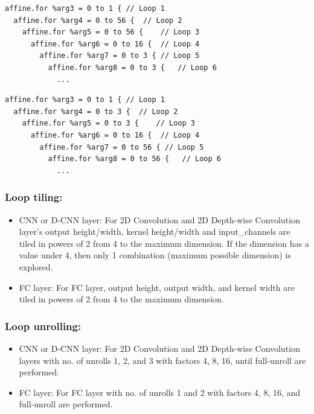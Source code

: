\begin{lstlisting}[caption={Example depth-wise conv2d at Affine dialect}, label={lst:dconv2dAffineOutputFirst}]
affine.for %arg3 = 0 to 1 { // Loop 1
  affine.for %arg4 = 0 to 56 {  // Loop 2
    affine.for %arg5 = 0 to 56 {    // Loop 3
      affine.for %arg6 = 0 to 16 {  // Loop 4
        affine.for %arg7 = 0 to 3 { // Loop 5
          affine.for %arg8 = 0 to 3 {   // Loop 6
            ...
\end{lstlisting}
\clearpage
\begin{lstlisting}[caption={Example depth-wise conv2d at Affine dialect}, label={lst:dconv2dAffineKernelFirst}]
affine.for %arg3 = 0 to 1 { // Loop 1
  affine.for %arg4 = 0 to 3 {  // Loop 2
    affine.for %arg5 = 0 to 3 {    // Loop 3
      affine.for %arg6 = 0 to 16 {  // Loop 4
        affine.for %arg7 = 0 to 56 { // Loop 5
          affine.for %arg8 = 0 to 56 {   // Loop 6
            ...
\end{lstlisting}

\subsubsection{Loop tiling:}
\begin{itemize}
    \item CNN or D-CNN layer: For 2D Convolution and 2D Depth-wise Convolution layer's output height/width, kernel height/width and input\_channels are tiled in powers of 2 from 4 to the maximum dimension. If the dimension has a value under 4, then only 1 combination (maximum possible dimension) is explored. 
    \item FC layer: For FC layer, output height, output width, and kernel width are tiled in powers of 2 from 4 to the maximum dimension.
\end{itemize}


\subsubsection{Loop unrolling:}
\begin{itemize}
    \item CNN or D-CNN layer: For 2D Convolution and 2D Depth-wise Convolution layers with no. of unrolls 1, 2, and 3 with factors 4, 8, 16, until full-unroll are performed.
    \item FC layer: For FC layer with no. of unrolls 1 and 2 with factors 4, 8, 16, and full-unroll are performed.

\end{itemize}

